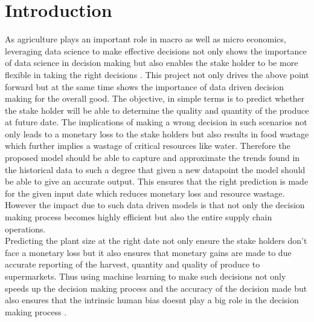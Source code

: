 \documentclass{article}
\begin{document}
\section{Introduction}
As agriculture plays an important role in macro as well as micro economics, leveraging data science to make effective decisions not only shows the importance of data science in decision making but also enables the stake holder to be more flexible in taking the right decisions \cite{meinke2009adaptation}.
This project not only drives the above point forward but at the same time shows the importance of data driven decision making for the overall good. The objective, in simple terms is to predict whether the stake holder will be able to determine the quality and quantity of the produce at future date. The implications of making a wrong decision in such scenarios not only leads to a monetary loss to the stake holders but also results in food wastage which further implies a wastage of critical resources like water. Therefore the proposed model should be able to capture and approximate the trends found in the historical data to such a degree that given a new datapoint the model should be able to give an accurate output. This ensures that the right prediction is made for the given input date which reduces monetary loss and resource wastage. However the impact due to such data driven models is that not only the decision making process becomes highly efficient but also the entire supply chain operations.\\
Predicting the plant size at the right date not only ensure the stake holders don't face a monetary loss but it also ensures that monetary gains are made to due accurate reporting of the harvest, quantity and quality of produce to supermarkets. Thus using machine learning to make such decisions not only speeds up the decision making process and the accuracy of the decision made but also ensures that the intrinsic human bias doesnt play a big role in the decision making process \cite{mcqueen1995applying}.
\end{document}
